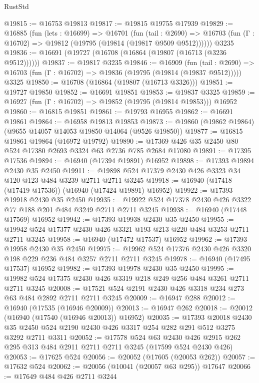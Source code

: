 \begin{lexlean}{RustStd}
\begin{coremodule}
@19815 := @16753 @19813
@19817 := @19815 @19755 @17939
@19829 := @16885
    (fun (lets : @16699) =>
    @16701
      (fun (tail : @2690) =>
      @16703 (fun (Γ : @16702) => @19812 (@19795 (@19814 (@19817 @9509 @9512))))))
    @3235
@19836 := @16691 (@19727 (@16708 (@16864 (@19807 (@16713 (@3236 @9512))))))
@19837 := @19817 @3235
@19846 := @16909
    (fun (tail : @2690) => @16703 (fun (Γ : @16702) => @19836 (@19795 (@19814 (@19837 @9512)))))
    @3325
@19850 := @16708 (@16864 (@19807 (@16713 @3326)))
@19851 := @19727 @19850
@19852 := @16691 @19851
@19853 := @19837 @3325
@19859 := @16927 (fun (Γ : @16702) => @19852 (@19795 (@19814 @19853))) @16952
@19860 := @16815 @19851
@19861 := @19793 @16955
@19862 := @16691 @19861
@19864 := @16958 @19813 @19853
@19873 := @19860 (@19862 @19864) (@9655 @14057 @14053 @19850 @14064 (@9526 @19850))
@19877 := @16815 @19861 @19864 (@16972 @19792)
@19890 := @17369 @426 @35 @2450 @80 @524 @17380 @2693 @3324 @63 @2736 @785 @2684 @17080
@19891 := @17395 @17536
@19894 := @16940 (@17394 @19891) @16952
@19898 := @17393 @19894 @2430 @35 @2450
@19911 := @19898 @524 @17379 @2430 @426 @3323 @34 @120 @123 @484 @3239 @2711 @2711 @3245
@19918 := @16940 (@17418 (@17419 @17536)) (@16940 (@17424 @19891) @16952)
@19922 := @17393 @19918 @2430 @35 @2450
@19935 := @19922 @524 @17378 @2430 @426 @3322 @77 @188 @201 @484 @3249 @2711 @2711 @3245
@19938 := @16940 (@17448 @17569) @16952
@19942 := @17393 @19938 @2430 @35 @2450
@19955 := @19942 @524 @17377 @2430 @426 @3321 @193 @213 @220 @484 @3253 @2711 @2711 @3245
@19958 := @16940 (@17472 @17537) @16952
@19962 := @17393 @19958 @2430 @35 @2450
@19975 := @19962 @524 @17376 @2430 @426 @3320 @198 @229 @236 @484 @3257 @2711 @2711 @3245
@19978 := @16940 (@17495 @17537) @16952
@19982 := @17393 @19978 @2430 @35 @2450
@19995 := @19982 @524 @17375 @2430 @426 @3319 @218 @249 @256 @484 @3261 @2711 @2711 @3245
@20008 := @17521 @524 @2191 @2430 @426 @3318 @234 @273 @63 @484 @2892 @2711 @2711 @3245
@20009 := @16947 @288
@20012 := @16940 (@17535 (@16946 @20009))
@20013 := @16947 @262
@20018 := @20012 (@16940 (@17540 (@16946 @20013)) @16952)
@20035 := @17393
    @20018
    @2430
    @35
    @2450
    @524
    @2190
    @2430
    @426
    @3317
    @254
    @282
    @291
    @512
    @3275
    @3292
    @2711
    @3311
@20052 := @17578
    @524
    @63
    @2430
    @426
    @2915
    @262
    @295
    @313
    @484
    @2911
    @2711
    @2711
    @3245
    (@17599 @524 @2430 @426)
@20053 := @17625 @524
@20056 := @20052 (@17605 (@20053 @262))
@20057 := @17632 @524
@20062 := @20056 (@10041 (@20057 @63 @295)) @17647
@20066 := @17649 @484 @426 @2711 @3244

\end{coremodule}
\end{lexlean}
